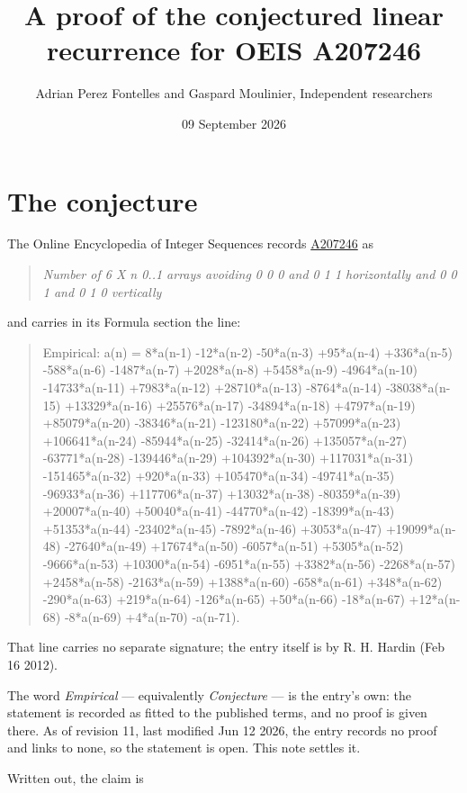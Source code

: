 \documentclass[11pt]{article}
\title{A proof of the conjectured linear recurrence for OEIS A207246}
\author{Adrian Perez Fontelles and Gaspard Moulinier, Independent researchers}
\date{09 September 2026}
\theoremstyle{definition}
\begin{document}
\maketitle
\section{The conjecture}

The Online Encyclopedia of Integer Sequences records \href{https://oeis.org/A207246}{A207246} as

\begin{quote}\itshape Number of 6 X n 0..1 arrays avoiding 0 0 0 and 0 1 1 horizontally and 0 0 1 and 0 1 0 vertically\end{quote}

and carries in its Formula section the line:

\begin{quote}\ttfamily Empirical: a(n) = 8*a(n-1) -12*a(n-2) -50*a(n-3) +95*a(n-4) +336*a(n-5) -588*a(n-6) -1487*a(n-7) +2028*a(n-8) +5458*a(n-9) -4964*a(n-10) -14733*a(n-11) +7983*a(n-12) +28710*a(n-13) -8764*a(n-14) -38038*a(n-15) +13329*a(n-16) +25576*a(n-17) -34894*a(n-18) +4797*a(n-19) +85079*a(n-20) -38346*a(n-21) -123180*a(n-22) +57099*a(n-23) +106641*a(n-24) -85944*a(n-25) -32414*a(n-26) +135057*a(n-27) -63771*a(n-28) -139446*a(n-29) +104392*a(n-30) +117031*a(n-31) -151465*a(n-32) +920*a(n-33) +105470*a(n-34) -49741*a(n-35) -96933*a(n-36) +117706*a(n-37) +13032*a(n-38) -80359*a(n-39) +20007*a(n-40) +50040*a(n-41) -44770*a(n-42) -18399*a(n-43) +51353*a(n-44) -23402*a(n-45) -7892*a(n-46) +3053*a(n-47) +19099*a(n-48) -27640*a(n-49) +17674*a(n-50) -6057*a(n-51) +5305*a(n-52) -9666*a(n-53) +10300*a(n-54) -6951*a(n-55) +3382*a(n-56) -2268*a(n-57) +2458*a(n-58) -2163*a(n-59) +1388*a(n-60) -658*a(n-61) +348*a(n-62) -290*a(n-63) +219*a(n-64) -126*a(n-65) +50*a(n-66) -18*a(n-67) +12*a(n-68) -8*a(n-69) +4*a(n-70) -a(n-71).\end{quote}

That line carries no separate signature; the entry itself is by R. H. Hardin (Feb 16 2012).

The word {\itshape Empirical} --- equivalently {\itshape Conjecture} --- is the entry's own: the statement is recorded as fitted to the published terms, and no proof is given there. As of revision 11, last modified Jun 12 2026, the entry records no proof and links to none, so the statement is open. This note settles it.

Written out, the claim is
\end{document}
